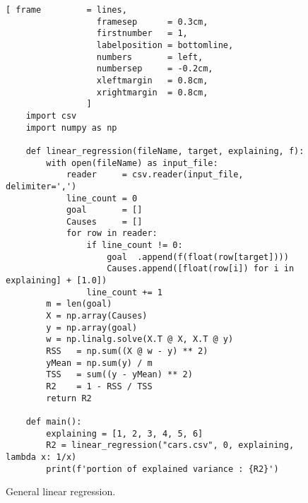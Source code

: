 \begin{figure}[!ht]
\centering
\begin{Verbatim}[ frame         = lines, 
                  framesep      = 0.3cm, 
                  firstnumber   = 1,
                  labelposition = bottomline,
                  numbers       = left,
                  numbersep     = -0.2cm,
                  xleftmargin   = 0.8cm,
                  xrightmargin  = 0.8cm,
                ]
    import csv
    import numpy as np
    
    def linear_regression(fileName, target, explaining, f):
        with open(fileName) as input_file:
            reader     = csv.reader(input_file, delimiter=',')
            line_count = 0
            goal       = []
            Causes     = []
            for row in reader:
                if line_count != 0:  
                    goal  .append(f(float(row[target])))  
                    Causes.append([float(row[i]) for i in explaining] + [1.0]) 
                line_count += 1
        m = len(goal)
        X = np.array(Causes)
        y = np.array(goal)
        w = np.linalg.solve(X.T @ X, X.T @ y)
        RSS   = np.sum((X @ w - y) ** 2)
        yMean = np.sum(y) / m
        TSS   = sum((y - yMean) ** 2)
        R2    = 1 - RSS / TSS
        return R2
    
    def main():
        explaining = [1, 2, 3, 4, 5, 6]
        R2 = linear_regression("cars.csv", 0, explaining, lambda x: 1/x)
        print(f'portion of explained variance : {R2}')
\end{Verbatim}
\vspace*{-0.3cm}
\caption{General linear regression.}
\label{fig:linear-regression.stlx}
\end{figure}


